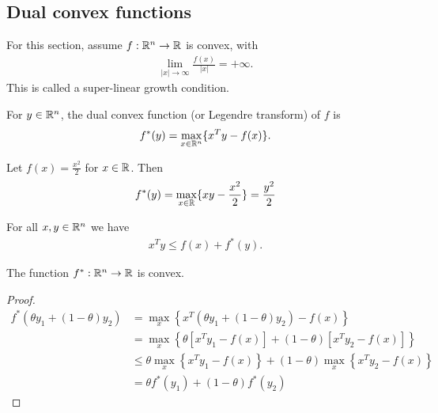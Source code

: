 \subsection{Dual convex functions}

For this section, assume $f:\mathbb{R}^n \to \mathbb{R}$ is convex, with
\begin{align}
\lim _{|x| \to \infty} \frac{f(x)}{|x|} = + \infty.
\end{align}
This is called a super-linear growth condition.

\begin{definition}
For $y \in \mathbb{R}^n$, the dual convex function (or Legendre transform) of $f$ is
\begin{align}
f^{*}(y) = \max _{x \in \mathbb{R}^n} \{ x^T y - f(x) \}.
\end{align}
\end{definition}

\begin{example}
Let $f(x) = \frac{x^2}{2}$ for $x \in \mathbb{R}$.
Then 
\begin{align}
f^{*}(y) = \max _{x \in \mathbb{R}} \{ x y - \frac{x^2}{2} \} = \frac{y^2}{2}
\end{align}
\end{example}

\begin{lemma}
For all $x, y \in \mathbb{R}^n$ we have
\begin{align}
x^T y \le f(x) + f^{*}(y).
\end{align}
\end{lemma}

\begin{theorem}
The function $f^{*}: \mathbb{R}^n \to \mathbb{R}$ is convex.
\end{theorem}

\begin{proof}
\begin{align}
f^{*}(\theta y_1 + (1-\theta) y_2 ) 
&= \max _{x} \left\{ x^T \left( \theta y_1 + (1-\theta) y_2 \right) - f(x) \right\} \\
&= \max _{x} \left\{ \theta \left[ x^T y_1 - f(x) \right] + (1-\theta) \left[ x^T y_2 - f(x) \right] \right\} \\
&\le \theta \max _{x} \left\{ x^T y_1 - f(x) \right\} + (1-\theta) \max _{x} \left\{ x^T y_2 - f(x) \right\} \\
&= \theta f^*(y_1) + (1-\theta) f^*(y_2) 
\end{align}
\end{proof}

